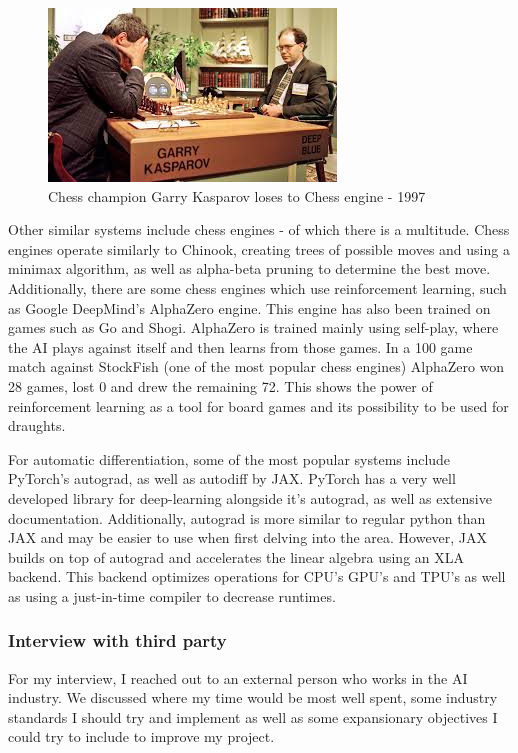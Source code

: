 \documentclass{article}
\begin{document}
    \begin{figure}
        \centering
        \includegraphics[scale=0.7]{download.jpg}
        \caption{Chess champion Garry Kasparov loses to Chess engine - 1997}
    \end{figure}
    Other similar systems include chess engines - of which there is a multitude. Chess engines operate similarly to Chinook, creating trees
    of possible moves and using a minimax algorithm, as well as alpha-beta pruning to determine the best move. Additionally, there are some
    chess engines which use reinforcement learning, such as Google DeepMind's AlphaZero engine. This engine has also been trained on games
    such as Go and Shogi. AlphaZero is trained mainly using self-play, where the AI plays against itself and then learns from those games.
    In a 100 game match against StockFish (one of the most popular chess engines) AlphaZero won 28 games, lost 0 and drew the remaining 72.
    This shows the power of reinforcement learning as a tool for board games and its possibility to be used for draughts.

    For automatic differentiation, some of the most popular systems include PyTorch's autograd, as well as autodiff by JAX. PyTorch has a very
    well developed library for deep-learning alongside it's autograd, as well as extensive documentation. Additionally, autograd is more similar
    to regular python than JAX and may be easier to use when first delving into the area. However, JAX builds on top of autograd and accelerates
    the linear algebra using an XLA backend. This backend optimizes operations for CPU's GPU's and TPU's as well as using a just-in-time compiler
    to decrease runtimes.

    \subsubsection{Interview with third party}
    For my interview, I reached out to an external person who works in the AI industry. We discussed where my time would be most well spent,
    some industry standards I should try and implement as well as some expansionary objectives I could try to include to improve my project.
\end{document}
